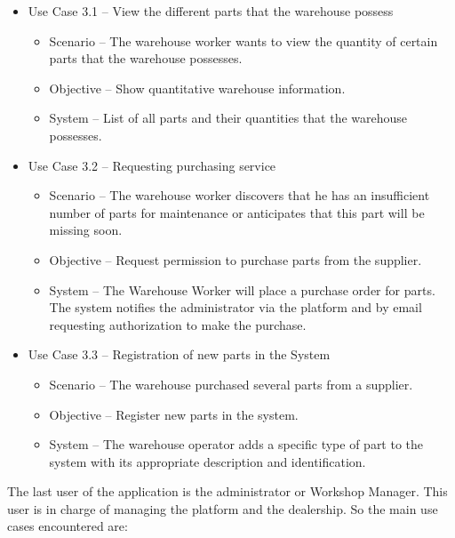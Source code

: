 \begin{itemize}
  \item Use Case 3.1 – View the different parts that the warehouse possess
  \begin{itemize}
    \item Scenario – The warehouse worker wants to view the quantity of certain parts that the warehouse possesses.
    \item Objective – Show quantitative warehouse information.
    \item System – List of all parts and their quantities that the warehouse possesses. 
  \end{itemize}
  \item Use Case 3.2 – Requesting purchasing service 
  \begin{itemize}
    \item Scenario – The warehouse worker discovers that he has an insufficient number of parts for maintenance or anticipates that this part will be missing soon.
    \item Objective – Request permission to purchase parts from the supplier.
    \item System – The Warehouse Worker will place a purchase order for parts. The system notifies the administrator via the platform and by email requesting authorization to make the purchase. 
  \end{itemize}
  \item Use Case 3.3 – Registration of new parts in the System
  \begin{itemize}
    \item Scenario – The warehouse purchased several parts from a supplier.
    \item Objective – Register new parts in the system.
    \item System – The warehouse operator adds a specific type of part to the system with its appropriate description and identification.
  \end{itemize}
\end{itemize}
\hfill \break

The last user of the application is the administrator or Workshop Manager. This user is in charge of managing the platform and the dealership. So the main use cases encountered are:

